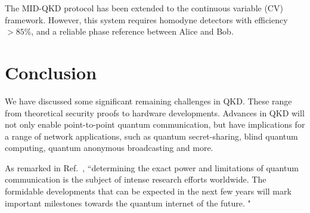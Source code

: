 The MID-QKD protocol has been extended to the continuous variable (CV) framework. However, this system requires homodyne detectors with efficiency $> 85\%$, and a reliable phase reference between Alice and Bob.  


\section{Conclusion}

We have discussed some significant remaining challenges in QKD.
These range from theoretical security proofs to hardware developments.
Advances in QKD will not only enable point-to-point quantum communication,
but have implications for a range of network applications, such as
quantum secret-sharing\cite{cleve1999share,PhysRevA.61.042311,PhysRevA.71.044301}, blind quantum computing\cite{broadbent2009universal,barz2012demonstration}, quantum anonymous
broadcasting\cite{christandl2005quantum} and more.

As remarked in Ref.~\cite{diamanti2016practical},
``determining the exact power and limitations of quantum
communication is the subject of intense research efforts worldwide.
The formidable developments that can be expected in the
next few years will mark important milestones towards the
quantum internet of the future. "  




